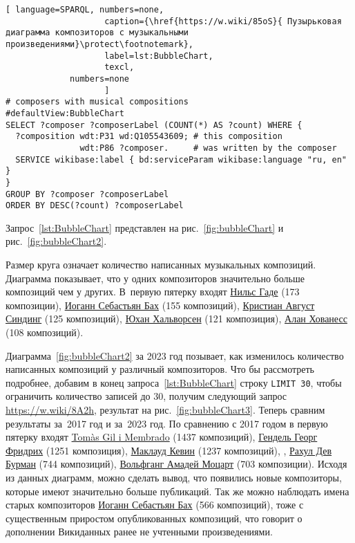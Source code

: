 \begin{lstlisting}[ language=SPARQL, numbers=none,
                    caption={\href{https://w.wiki/85oS}{ Пузырьковая диаграмма композиторов с музыкальными произведениями}\protect\footnotemark},
                    label=lst:BubbleChart,
                    texcl,
	         numbers=none
                    ]
# composers with musical compositions
#defaultView:BubbleChart
SELECT ?composer ?composerLabel (COUNT(*) AS ?count) WHERE {
  ?composition wdt:P31 wd:Q105543609; # this composition
               wdt:P86 ?composer.     # was written by the composer
  SERVICE wikibase:label { bd:serviceParam wikibase:language "ru, en" }
}
GROUP BY ?composer ?composerLabel
ORDER BY DESC(?count) ?composerLabel
\end{lstlisting}%

Запрос~\ref{lst:BubbleChart} представлен на рис.~\ref{fig:bubbleChart} и рис.~\ref{fig:bubbleChart2}.

Размер круга означает количество написанных музыкальных композиций. Диаграмма показывает, что у одних композиторов значительно больше композиций чем у других. В~первую пятерку входят \href{https://ru.wikipedia.org/wiki/Гаде,_Нильс}{Нильс Гаде} (\num{173} композиции), \href{https://ru.wikipedia.org/wiki/Бах,_Иоганн_Себастьян}{Иоганн Себастьян Бах} (\num{155} композиций), \href{https://ru.wikipedia.org/wiki/Синдинг,_Кристиан_Август}{Кристиан Август Синдинг} (\num{125} композиций), \href{https://ru.wikipedia.org/wiki/Хальворсен,_Юхан}{Юхан Хальворсен} (\num{121} композиция), \href{https://ru.wikipedia.org/wiki/Хованесс,_Алан}{Алан Хованесс} (\num{108} композиций).

Диаграмма~\ref{fig:bubbleChart2} за 2023 год позывает, как изменилось количество написанных композиций у различный композиторов. Что бы рассмотреть подробнее, добавим в конец запроса~\ref{lst:BubbleChart} строку  \lstinline|LIMIT 30|, чтобы ограничить количество записей до 30, получим следующий запрос \href{https://w.wiki/8A2h}{https://w.wiki/8A2h}, результат на рис.~\ref{fig:bubbleChart3}. Теперь сравним результаты за~2017 год и за~2023 год.
По сравнению с 2017 годом в первую пятерку входят \href{https://ca.wikipedia.org/wiki/Tomàs_Gil_i_Membrado}{Tomàs Gil i Membrado} (\num{1437} композиций), \href{https://ru.wikipedia.org/wiki/Гендель,_Георг_Фридрих}{Гендель Георг Фридрих} (\num{1251} композиция), \href{https://ru.wikipedia.org/wiki/Маклауд,_Кевин}{Маклауд Кевин} (\num{1237} композиций), , \href{https://en.wikipedia.org/wiki/R._D._Burman}{Рахул Дев Бурман} (\num{744} композиций), \href{https://ru.wikipedia.org/wiki/Моцарт,_Вольфганг_Амадей}{Вольфганг Амадей Моцарт} (\num{703} композиции). Исходя из данных диаграмм, можно сделать вывод, что появились новые композиторы, которые имеют значительно больше публикаций. Так же можно наблюдать имена старых композиторов \href{https://ru.wikipedia.org/wiki/Бах,_Иоганн_Себастьян}{Иоганн Себастьян Бах} (\num{566} композиций), тоже с существенным приростом опубликованных композиций, что говорит о дополнении Викиданных ранее не учтенными произведениями.

